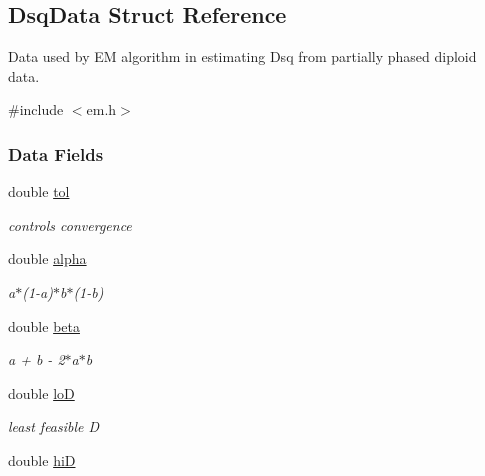 \hypertarget{struct_dsq_data}{\subsection{Dsq\-Data Struct Reference}
\label{struct_dsq_data}
}


Data used by E\-M algorithm in estimating Dsq from partially phased diploid data.  




{\ttfamily \#include $<$em.\-h$>$}

\subsubsection*{Data Fields}
\begin{DoxyCompactItemize}
\item 
\hypertarget{struct_dsq_data_a2817fb4b70921ae3a9722c1fbf0f4a58}{double \hyperlink{struct_dsq_data_a2817fb4b70921ae3a9722c1fbf0f4a58}{tol}}\label{struct_dsq_data_a2817fb4b70921ae3a9722c1fbf0f4a58}

\begin{DoxyCompactList}\small\item\em controls convergence \end{DoxyCompactList}\item 
\hypertarget{struct_dsq_data_a40c3fdd276e9c89802f1173601460afc}{double \hyperlink{struct_dsq_data_a40c3fdd276e9c89802f1173601460afc}{alpha}}\label{struct_dsq_data_a40c3fdd276e9c89802f1173601460afc}

\begin{DoxyCompactList}\small\item\em a$\ast$(1-\/a)$\ast$b$\ast$(1-\/b) \end{DoxyCompactList}\item 
\hypertarget{struct_dsq_data_a9104819f67f85886818033b08e56cd5d}{double \hyperlink{struct_dsq_data_a9104819f67f85886818033b08e56cd5d}{beta}}\label{struct_dsq_data_a9104819f67f85886818033b08e56cd5d}

\begin{DoxyCompactList}\small\item\em a + b -\/ 2$\ast$a$\ast$b \end{DoxyCompactList}\item 
\hypertarget{struct_dsq_data_aa1b3a9ab84e0b900689f4f87939f93b5}{double \hyperlink{struct_dsq_data_aa1b3a9ab84e0b900689f4f87939f93b5}{lo\-D}}\label{struct_dsq_data_aa1b3a9ab84e0b900689f4f87939f93b5}

\begin{DoxyCompactList}\small\item\em least feasible D \end{DoxyCompactList}\item 
\hypertarget{struct_dsq_data_abfab53744a39ef6d7bdebc293344d7a9}{double \hyperlink{struct_dsq_data_abfab53744a39ef6d7bdebc293344d7a9}{hi\-D}}\label{struct_dsq_data_abfab53744a39ef6d7bdebc293344d7a9}


\end{DoxyCompactItemize}
